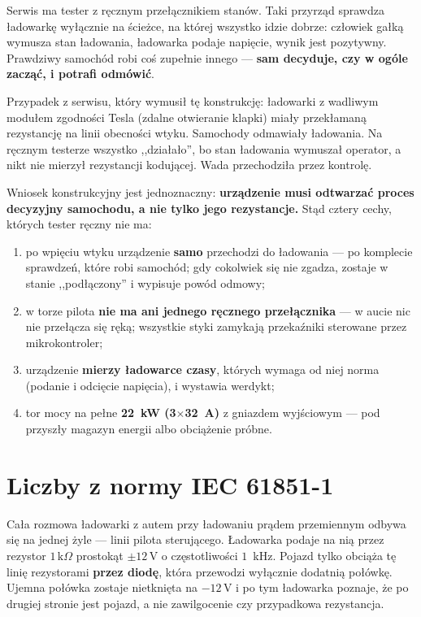 \documentclass[a4paper,11pt]{article}
\newcommand{\kohm}{\,\mathrm{k}\Omega}
\newcommand{\volt}{\,\mathrm{V}}
\begin{document}
Serwis ma tester z ręcznym przełącznikiem stanów. Taki przyrząd sprawdza ładowarkę
wyłącznie na ścieżce, na której wszystko idzie dobrze: człowiek gałką wymusza stan
ładowania, ładowarka podaje napięcie, wynik jest pozytywny. Prawdziwy samochód robi
coś zupełnie innego --- \textbf{sam decyduje, czy w ogóle zacząć, i potrafi odmówić}.

Przypadek z serwisu, który wymusił tę konstrukcję: ładowarki z wadliwym modułem
zgodności Tesla (zdalne otwieranie klapki) miały przekłamaną rezystancję na linii
obecności wtyku. Samochody odmawiały ładowania. Na ręcznym testerze wszystko
,,działało'', bo stan ładowania wymuszał operator, a nikt nie mierzył rezystancji
kodującej. Wada przechodziła przez kontrolę.

Wniosek konstrukcyjny jest jednoznaczny: \textbf{urządzenie musi odtwarzać proces
decyzyjny samochodu, a nie tylko jego rezystancje.} Stąd cztery cechy, których
tester ręczny nie ma:

\begin{enumerate}
\item po wpięciu wtyku urządzenie \textbf{samo} przechodzi do ładowania --- po
      komplecie sprawdzeń, które robi samochód; gdy cokolwiek się nie zgadza,
      zostaje w stanie ,,podłączony'' i wypisuje powód odmowy;
\item w torze pilota \textbf{nie ma ani jednego ręcznego przełącznika} --- w aucie
      nic nie przełącza się ręką; wszystkie styki zamykają przekaźniki sterowane
      przez mikrokontroler;
\item urządzenie \textbf{mierzy ładowarce czasy}, których wymaga od niej norma
      (podanie i odcięcie napięcia), i wystawia werdykt;
\item tor mocy na pełne \textbf{22~kW (3$\times$32~A)} z gniazdem wyjściowym ---
      pod przyszły magazyn energii albo obciążenie próbne.
\end{enumerate}

\section{Liczby z normy IEC 61851-1}

Cała rozmowa ładowarki z autem przy ładowaniu prądem przemiennym odbywa się na
jednej żyle --- linii pilota sterującego. Ładowarka podaje na nią przez rezystor
$1\kohm$ prostokąt $\pm 12\volt$ o częstotliwości $1$~kHz. Pojazd tylko obciąża tę
linię rezystorami \textbf{przez diodę}, która przewodzi wyłącznie dodatnią połówkę.
Ujemna połówka zostaje nietknięta na $-12\volt$ i po tym ładowarka poznaje, że po
drugiej stronie jest pojazd, a nie zawilgocenie czy przypadkowa rezystancja.
\end{document}
